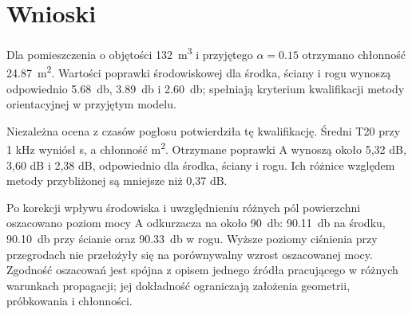 \section*{Wnioski}
Dla pomieszczenia o objętości \qty{132}{\metre\cubed} i przyjętego
$\alpha=\num{0.15}$ otrzymano chłonność \qty{24.87}{\metre\squared}.
Wartości poprawki środowiskowej dla środka, ściany i rogu wynoszą
odpowiednio \qty{5.68}{\decibel}, \qty{3.89}{\decibel}
i \qty{2.60}{\decibel}; spełniają kryterium kwalifikacji metody
orientacyjnej w przyjętym modelu.

Niezależna ocena z czasów pogłosu potwierdziła tę kwalifikację.
Średni T20 przy 1 kHz wyniósł \reverbTime\;\unit{\second}, a chłonność
\reverbAbsorption\;\unit{\metre\squared}. Otrzymane poprawki A wynoszą
około 5,32 dB, 3,60 dB i 2,38 dB, odpowiednio dla środka, ściany i rogu.
Ich różnice względem metody przybliżonej są mniejsze niż 0,37 dB.

Po korekcji wpływu środowiska i uwzględnieniu różnych pól powierzchni
oszacowano poziom mocy A odkurzacza na około \qty{90}{\decibel}:
\qty{90.11}{\decibel} na środku, \qty{90.10}{\decibel} przy ścianie
oraz \qty{90.33}{\decibel} w rogu. Wyższe poziomy ciśnienia przy
przegrodach nie przełożyły się na porównywalny wzrost oszacowanej mocy.
Zgodność oszacowań jest spójna z opisem jednego źródła pracującego
w różnych warunkach propagacji; jej dokładność ograniczają założenia
geometrii, próbkowania i chłonności.
